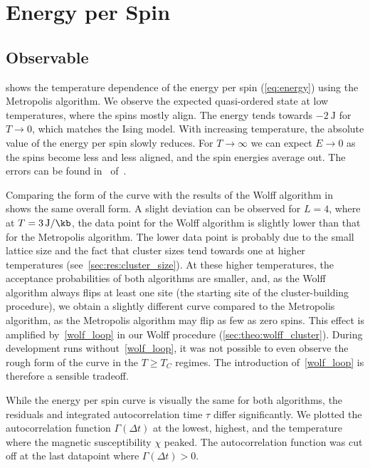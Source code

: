 \section{Energy per Spin}\label{sec:res:energy}
	\subsection{Observable}\label{sec:res:energy:observable}
		 shows the temperature dependence of the energy per spin (\cref{eq:energy}) using the Metropolis algorithm. We observe the expected quasi-ordered state at low temperatures, where the spins mostly align. The energy tends towards $\SI{-2}{\joule}$ for $T\rightarrow 0$, which matches the Ising model. With increasing temperature, the absolute value of the energy per spin slowly reduces. For $T \rightarrow \infty$ we can expect $E \rightarrow 0$ as the spins become less and less aligned, and the spin energies average out. The errors can be found in~ of~.
		
		Comparing the form of the curve with the results of the Wolff algorithm in~ shows the same overall form. A slight deviation can be observed for $L = 4$, where at $T = \SI{3}{\joule\per\kb}$, the data point for the Wolff algorithm is slightly lower than that for the Metropolis algorithm. The lower data point is probably due to the small lattice size and the fact that cluster sizes tend towards one at higher temperatures (see~\cref{sec:res:cluster_size}). At these higher temperatures, the acceptance probabilities of both algorithms are smaller, and, as the Wolff algorithm always flips at least one site (the starting site of the cluster-building procedure), we obtain a slightly different curve compared to the Metropolis algorithm, as the Metropolis algorithm may flip as few as zero spins. This effect is amplified by~\cref{wolf_loop} in our Wolff procedure (\cref{sec:theo:wolff_cluster}). During development runs without~\cref{wolf_loop}, it was not possible to even observe the rough form of the curve in the $T \geq T_C$ regimes. The introduction of~\cref{wolf_loop} is therefore a sensible tradeoff.
		
		While the energy per spin curve is visually the same for both algorithms, the residuals and integrated autocorrelation time $\tau$ differ significantly. We plotted the autocorrelation function $\Gamma(\Delta t)$ at the lowest, highest, and the temperature where  the magnetic susceptibility $\chi$ peaked. The autocorrelation function was cut off at the last datapoint where $\Gamma(\Delta t) > \num{0}$.
		
